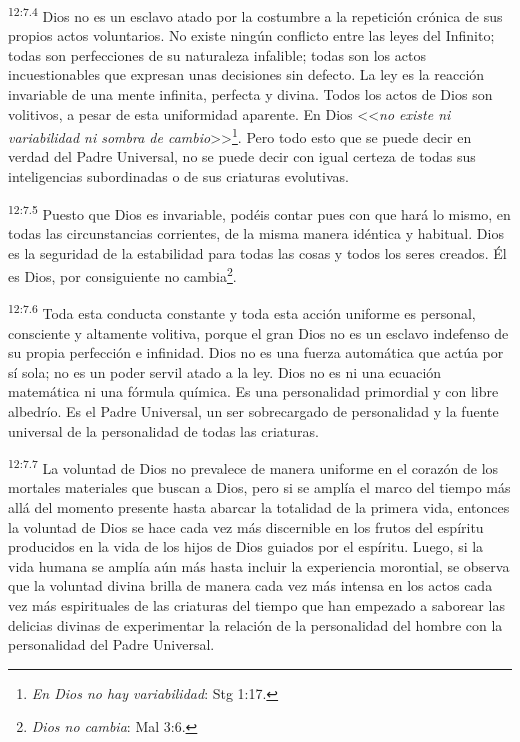 \par
\textsuperscript{12:7.4} Dios no es un esclavo atado por la costumbre a la repetición crónica de sus propios actos voluntarios. No existe ningún conflicto entre las leyes del Infinito; todas son perfecciones de su naturaleza infalible; todas son los actos incuestionables que expresan unas decisiones sin defecto. La ley es la reacción invariable de una mente infinita, perfecta y divina. Todos los actos de Dios son volitivos, a pesar de esta uniformidad aparente. En Dios <<\textit{no existe ni variabilidad ni sombra de cambio}>>\footnote{\textit{En Dios no hay variabilidad}: Stg 1:17.}. Pero todo esto que se puede decir en verdad del Padre Universal, no se puede decir con igual certeza de todas sus inteligencias subordinadas o de sus criaturas evolutivas.

\par
\textsuperscript{12:7.5} Puesto que Dios es invariable, podéis contar pues con que hará lo mismo, en todas las circunstancias corrientes, de la misma manera idéntica y habitual. Dios es la seguridad de la estabilidad para todas las cosas y todos los seres creados. Él es Dios, por consiguiente no cambia\footnote{\textit{Dios no cambia}: Mal 3:6.}.

\par
\textsuperscript{12:7.6} Toda esta conducta constante y toda esta acción uniforme es personal, consciente y altamente volitiva, porque el gran Dios no es un esclavo indefenso de su propia perfección e infinidad. Dios no es una fuerza automática que actúa por sí sola; no es un poder servil atado a la ley. Dios no es ni una ecuación matemática ni una fórmula química. Es una personalidad primordial y con libre albedrío. Es el Padre Universal, un ser sobrecargado de personalidad y la fuente universal de la personalidad de todas las criaturas.

\par
\textsuperscript{12:7.7} La voluntad de Dios no prevalece de manera uniforme en el corazón de los mortales materiales que buscan a Dios, pero si se amplía el marco del tiempo más allá del momento presente hasta abarcar la totalidad de la primera vida, entonces la voluntad de Dios se hace cada vez más discernible en los frutos del espíritu producidos en la vida de los hijos de Dios guiados por el espíritu. Luego, si la vida humana se amplía aún más hasta incluir la experiencia morontial, se observa que la voluntad divina brilla de manera cada vez más intensa en los actos cada vez más espirituales de las criaturas del tiempo que han empezado a saborear las delicias divinas de experimentar la relación de la personalidad del hombre con la personalidad del Padre Universal.

